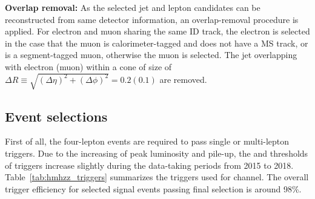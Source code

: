 \textbf{Overlap removal:}
As the selected jet and lepton candidates can be reconstructed from same detector information, an overlap-removal procedure is applied.
For electron and muon sharing the same ID track, the electron is selected in the case that the muon is calorimeter-tagged and does not have a MS track, or is a segment-tagged muon, otherwise the muon is selected.
The jet overlapping with electron (muon) within a cone of size of $\Delta R\equiv \sqrt{(\Delta \eta)^2 + (\Delta \phi)^2}= 0.2 (0.1)$ are removed.

\subsection{Event selections}
\label{sec:hmhzz_eventsel}

First of all, the four-lepton events are required to pass single or multi-lepton triggers.
Due to the increasing of peak luminosity and pile-up, the \pt and \et thresholds of triggers increase slightly during the data-taking periods from 2015 to 2018.
Table~\ref{tab:hmhzz_triggers} summarizes the triggers used for \llll channel. 
The overall trigger efficiency for selected signal events passing final selection is around 98\%.


